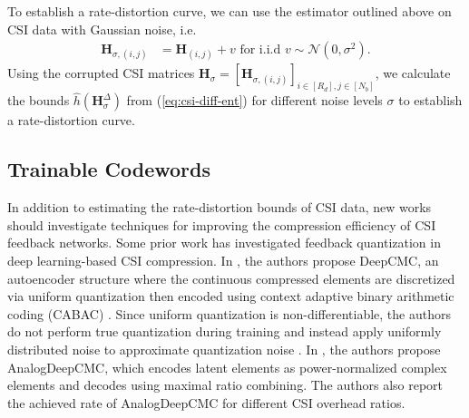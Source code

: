 To establish a rate-distortion curve, we can use the estimator outlined above on CSI data with Gaussian noise, i.e.
\begin{align*}
	\mathbf H_{\sigma,(i,j)} &= \mathbf H_{(i,j)} + v \text{ for i.i.d } v \sim \mathcal{N}(0,\sigma^2).
\end{align*}
Using the corrupted CSI matrices $\mathbf H_{\sigma}=\left[\mathbf H_{\sigma,(i,j)}\right]_{i\in [R_d],j\in [N_b]}$, we calculate the bounds $\hat h(\mathbf H_{\sigma}^\Delta)$ from (\ref{eq:csi-diff-ent}) for different noise levels $\sigma$ to establish a rate-distortion curve.

\subsection{Trainable Codewords}

In addition to estimating the rate-distortion bounds of CSI data, new works should investigate techniques for improving the compression efficiency of CSI feedback networks. Some prior work has investigated feedback quantization in deep learning-based CSI compression. In \cite{ref:Yang2019DeepCMC}, the authors propose DeepCMC, an autoencoder structure where the continuous compressed elements are discretized via uniform quantization then encoded using context adaptive binary arithmetic coding (CABAC) \cite{ref:Marpe2003CABAC}. Since uniform quantization is non-differentiable, the authors do not perform true quantization during training and instead apply uniformly distributed noise to approximate quantization noise \cite{ref:Yang2019DeepCMC}. In \cite{ref:Mashhadi2020AnalogDeepCMC}, the authors propose AnalogDeepCMC, which encodes latent elements as power-normalized complex elements and decodes using maximal ratio combining. The authors also report the achieved rate of AnalogDeepCMC for different CSI overhead ratios.

